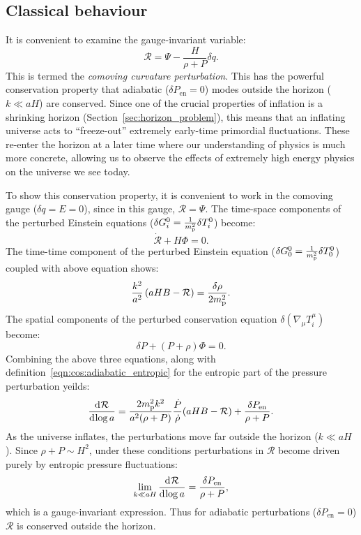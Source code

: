 \subsection{Classical behaviour}
\label{sec:cos:freeze_out}
It is convenient to examine the gauge-invariant variable:
\begin{equation}
  \mathcal{R} = \Psi - \frac{H}{\rho+P}\delta q.
  \label{eqn:cos:CCP}
\end{equation}
This is termed the {\em comoving curvature perturbation}. This has the powerful conservation property that adiabatic (\(\delta P_\mathrm{en}=0\)) modes outside the horizon (\(k\ll a H\)) are conserved. Since one of the crucial properties of inflation is a shrinking horizon (Section~\ref{sec:horizon_problem}), this means that an inflating universe acts to ``freeze-out'' extremely early-time primordial fluctuations. These re-enter the horizon at a later time where our understanding of physics is much more concrete, allowing us to observe the effects of extremely high energy physics on the universe we see today.


To show this conservation property, it is convenient to work in the comoving gauge (\(\delta q = E = 0\)), since in this gauge, \( \mathcal{R} = \Psi \).  
The time-space components of the perturbed Einstein equations (\( \delta G^{0}_i = \frac{1}{m_{\mathrm{p}}^2}\delta T^{0}_i\)) become:
\begin{equation}
    \dot{\mathcal{R}} + H \Phi = 0.
\end{equation}
The time-time component of the perturbed Einstein equation (\( \delta G^{0}_0 = \frac{1}{m_{\mathrm{p}}^2}\delta T^{0}_0\)) coupled with above equation shows:
\begin{equation}
    \frac{k^2}{a^2}\left(a H B - \mathcal{R} \right) = \frac{\delta\rho}{2m_{\mathrm{p}}^2}.
\end{equation}
The spatial components of the perturbed conservation equation \(\delta( \nabla_\mu T^\mu_i )\) become:
\begin{equation}
    \delta P + (P + \rho)\Phi = 0.
\end{equation}
Combining the above three equations, along with definition~\eqref{eqn:cos:adiabatic_entropic} for the entropic part of the pressure perturbation yeilds:
\begin{equation}
    \frac{\operatorname{d}^{}\!{\mathcal{R}}}{\operatorname{d}^{}\!{\log a}} = \frac{2m_{\mathrm{p}}^2 k^2}{a^2(\rho + P)}\frac{\dot{P}}{\dot{\rho}}(a H B - \mathcal{R}) + \frac{\delta P_\mathrm{en}}{\rho + P}.
\end{equation}
As the universe inflates, the perturbations move far outside the horizon (\( {k \ll a H} \)). Since \(\rho + P \sim H^2\), under these conditions perturbations in \(\mathcal{R}\) become driven purely by entropic pressure fluctuations: 
\begin{equation}
    \lim\limits_{k\ll aH} \frac{\operatorname{d}^{}\!{\mathcal{R}}}{\operatorname{d}^{}\!{\log a}} =  \frac{\delta P_\mathrm{en}}{\rho + P},
\end{equation}
which is a gauge-invariant expression. Thus for adiabatic perturbations (\({\delta P_\mathrm{en}=0}\)) \(\mathcal{R}\) is conserved outside the horizon.



